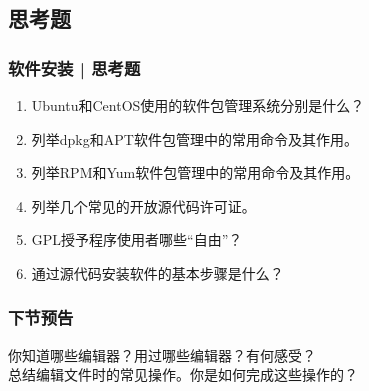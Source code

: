 \subsection{思考题}
\begin{frame}
  \frametitle{软件安装 | 思考题}
  \begin{enumerate}
    \item Ubuntu和CentOS使用的软件包管理系统分别是什么？
    \item 列举dpkg和APT软件包管理中的常用命令及其作用。
    \item 列举RPM和Yum软件包管理中的常用命令及其作用。
    \item 列举几个常见的开放源代码许可证。
    \item GPL授予程序使用者哪些“自由”？
    \item 通过源代码安装软件的基本步骤是什么？
  \end{enumerate}
\end{frame}

\begin{frame}
  \frametitle{下节预告}
  你知道哪些编辑器？用过哪些编辑器？有何感受？\\
  总结编辑文件时的常见操作。你是如何完成这些操作的？
\end{frame}




